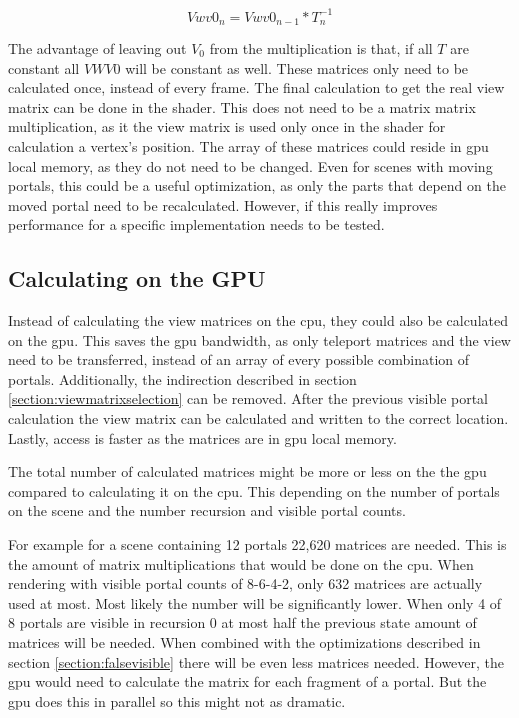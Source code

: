 $$Vwv0_n = Vwv0_{n-1} * T_n^{-1}$$

The advantage of leaving out $V_0$ from the multiplication is that, if all $T$ are constant all $VWV0$ will be constant as well. These matrices only need to be calculated once, instead of every frame. The final calculation to get the real view matrix can be done in the shader. This does not need to be a matrix matrix multiplication, as it the view matrix is used only once in the shader for calculation a vertex's position. The array of these matrices could reside in \gls{gpu} local memory, as they do not need to be changed. Even for scenes with moving portals, this could be a useful optimization, as only the parts that depend on the moved portal need to be recalculated. However, if this really improves performance for a specific implementation needs to be tested.

\subsection{Calculating on the GPU}
Instead of calculating the view matrices on the \gls{cpu}, they could also be calculated on the \gls{gpu}.
This saves the \gls{gpu} bandwidth, as only teleport matrices and the view need to be transferred, instead of an array of every possible combination of portals. Additionally, the indirection described in section \ref{section:viewmatrixselection} can be removed. After the previous visible portal calculation the view matrix can be calculated and written to the correct location. Lastly, access is faster as the matrices are in \gls{gpu} local memory.

The total number of calculated matrices might be more or less on the the \gls{gpu} compared to calculating it on the \gls{cpu}. This  depending on the number of portals on the scene and the number recursion and visible portal counts. 

For example for a scene containing 12 portals 22,620 matrices are needed. This is the amount of matrix multiplications that would be done on the \gls{cpu}. When rendering with visible portal counts of 8-6-4-2, only 632 matrices are actually used at most. Most likely the number will be significantly lower. When only 4 of 8 portals are visible in recursion 0 at most half the previous state amount of matrices will be needed. When combined with the optimizations described in section \ref{section:falsevisible} there will be even less matrices needed. However, the \gls{gpu} would need to calculate the matrix for each fragment of a portal. But the \gls{gpu} does this in parallel so this might not as dramatic. 

